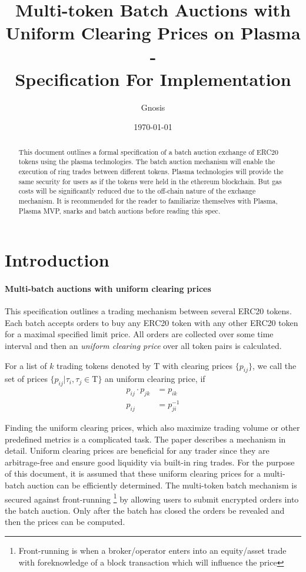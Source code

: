 \documentclass[11pt,parskip=full]{scrartcl}%
\title{
  Multi-token Batch Auctions with Uniform Clearing Prices on Plasma\\
  - \\
  \Large Specification For Implementation}
\author{Gnosis}
\date{\today}
\newcommand{\Tau}{\mathrm{T}}
\newcommand*{\erc}{ERC20 }
\begin{document}
\maketitle


\begin{abstract}

This document outlines a formal specification of a batch auction exchange of ERC20 tokens using the plasma technologies. 
The batch auction mechanism will enable the execution of ring trades between different tokens. 
Plasma technologies will provide the same security for users as if the tokens were held in the ethereum blockchain. 
But gas costs will be significantly reduced due to the off-chain nature of the exchange mechanism. 
It is recommended for the reader to familiarize themselves with Plasma\cite{plasma}, Plasma MVP\cite{MVP}, snarks\cite{snarks} and batch auctions\cite{batch} before reading this spec. 

\end{abstract}

\tableofcontents

\newpage
\section{Introduction}
\label{sec:introduction}

\paragraph{Multi-batch auctions with uniform clearing prices}

This specification outlines a trading mechanism between several \erc tokens. Each batch accepts orders to buy any \erc token with any other \erc token for a maximal specified limit price. All orders are collected over some time interval and then an \emph{uniform clearing price} over all token pairs is calculated. 

For a list of $k$ trading tokens denoted by $\Tau$ with clearing prices $\{p_{ij}\}$, we call the set of prices $\{p_{ij}| \tau_i, \tau_j \in \Tau\}$ an uniform clearing price, if
\begin{align} 
  p_{ij} \cdot p_{jk} &= p_{ik}\\
  p_{ij} &= p_{ji}^{-1}
\end{align}


Finding the uniform clearing prices, which also maximize trading volume or other predefined metrics is a complicated task. The paper \cite{priceOptimization} describes a mechanism in detail. Uniform clearing prices are beneficial for any trader since they are arbitrage-free and ensure good liquidity via built-in ring trades. For the purpose of this document, it is assumed that these uniform clearing prices for a multi-batch auction can be efficiently determined. \newline
The multi-token batch mechanism is secured against front-running \footnote{Front-running is when a broker/operator enters into an equity/asset trade with foreknowledge of a block transaction which will influence the price} by allowing users to submit encrypted orders into the batch auction. Only after the batch has closed the orders be revealed and then the prices can be computed. 
\end{document}
